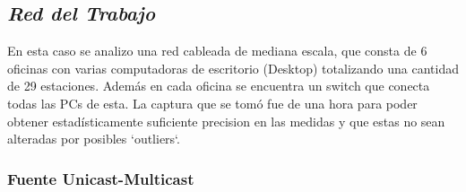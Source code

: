 \subsection{\emph{Red del Trabajo}}

En esta caso se analizo una red cableada de mediana escala, 
que consta de 6 oficinas con varias computadoras de escritorio (Desktop) totalizando
una cantidad de 29 estaciones. Además en cada oficina se encuentra un switch que conecta todas
las PCs de esta. La captura que se tomó fue de una hora para 
poder obtener estadísticamente suficiente precision en las medidas y que estas no sean
alteradas por posibles `outliers`.

\subsubsection{Fuente Unicast-Multicast}

\begin{figure}
	\begin{minipage}[b]{0.9\linewidth}
	\end{minipage}
\end{figure}


